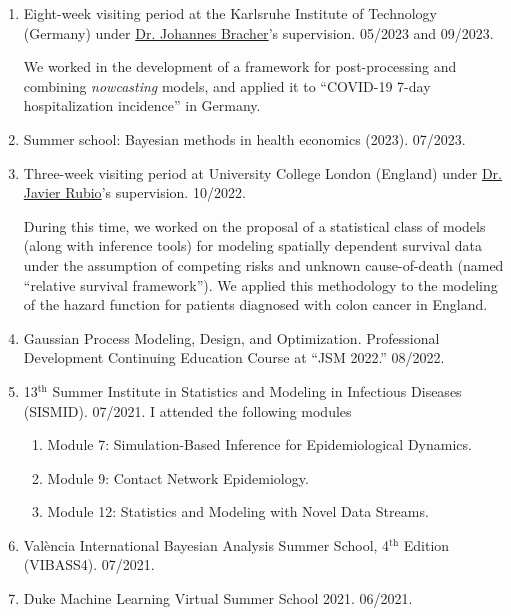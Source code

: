 \documentclass[10pt, ]{article}
\begin{document}
	\begin{enumerate}[noitemsep, topsep=0pt]
		\item Eight-week visiting period at the Karlsruhe Institute of Technology (Germany) under \href{https://jbracher.github.io/}{Dr. Johannes Bracher}'s supervision. 05/2023 and 09/2023.\vspace{3pt}
		
		We worked in the development of a framework for post-processing and combining \textit{nowcasting} models, and applied it to ``COVID-19 7-day hospitalization incidence'' in Germany.\vspace{3pt}
		
		\item Summer school: Bayesian methods in health economics (2023).  07/2023.
		
		\item Three-week visiting period at University College London (England) under \href{https://sites.google.com/site/fjavierrubio67/}{Dr. Javier Rubio}'s supervision. 10/2022.\vspace{3pt}
		
		During this time, we worked on the proposal of a statistical class of models (along with inference tools) for modeling spatially dependent survival data under the assumption of competing risks and unknown cause-of-death (named ``relative survival framework''). We applied this methodology to the modeling of the hazard function for patients diagnosed with colon cancer in England.\vspace{3pt}
		
		
		\item Gaussian Process Modeling, Design, and Optimization. Professional Development Continuing Education Course at ``JSM 2022.'' 08/2022.
		
		\item 13${}^{\text{th}}$ Summer Institute in Statistics and Modeling in Infectious Diseases (SISMID). 07/2021. I attended the following modules \vspace{-6pt}
		\begin{enumerate}[label*=\arabic*., noitemsep]
			\item Module 7: Simulation-Based Inference for Epidemiological Dynamics.
			\item Module 9: Contact Network Epidemiology.
			\item Module 12: Statistics and Modeling with Novel Data Streams.
		\end{enumerate}
		
		\item València International Bayesian Analysis Summer School, 4${}^{\text{th}}$ Edition (VIBASS4). 07/2021.
		
		\item Duke Machine Learning Virtual Summer School 2021. 06/2021.
	\end{enumerate}
	
\end{document}
